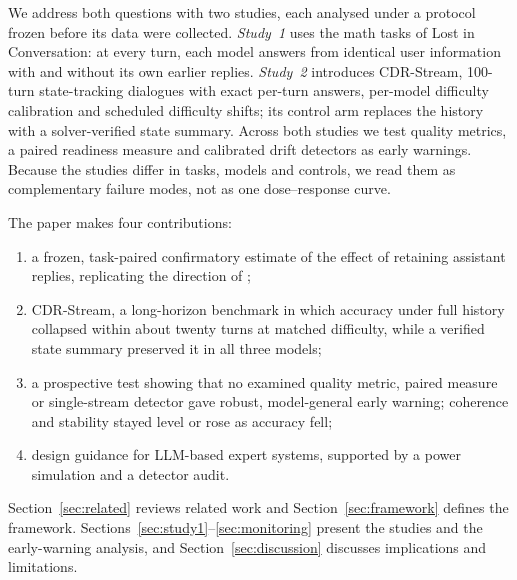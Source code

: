 We address both questions with two studies, each analysed under a protocol
frozen before its data were collected. \emph{Study~1} uses the math tasks of
Lost in Conversation: at every turn, each model answers from identical user
information with and without its own earlier replies. \emph{Study~2}
introduces CDR-Stream, 100-turn state-tracking dialogues with exact per-turn
answers, per-model difficulty calibration and scheduled difficulty shifts; its
control arm replaces the history with a solver-verified state summary. Across
both studies we test quality metrics, a paired readiness measure and
calibrated drift detectors as early warnings. Because the studies differ in
tasks, models and controls, we read them as complementary failure modes, not as
one dose--response curve.

The paper makes four contributions:
\begin{enumerate}
  \item a frozen, task-paired confirmatory estimate of the effect of retaining
    assistant replies, replicating the direction of \citet{huang2026benefit};
  \item CDR-Stream, a long-horizon benchmark in which accuracy under full
    history collapsed within about twenty turns at matched difficulty, while a
    verified state summary preserved it in all three models;
  \item a prospective test showing that no examined quality metric, paired
    measure or single-stream detector gave robust, model-general early warning;
    coherence and stability stayed level or rose as accuracy fell;
  \item design guidance for LLM-based expert systems, supported by a power
    simulation and a detector audit.
\end{enumerate}
Section~\ref{sec:related} reviews related work and Section~\ref{sec:framework}
defines the framework. Sections~\ref{sec:study1}--\ref{sec:monitoring} present
the studies and the early-warning analysis, and Section~\ref{sec:discussion}
discusses implications and limitations.
